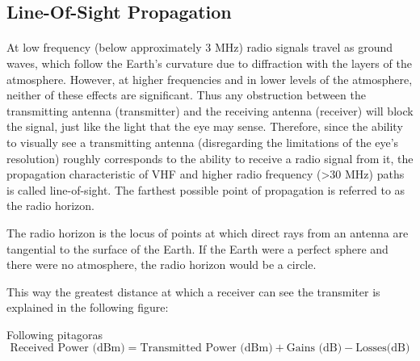 \subsection*{Line-Of-Sight Propagation}
\paragraph{}
At low frequency (below approximately 3 MHz) radio signals travel as ground waves, which follow the Earth's curvature due to diffraction with the layers of the atmosphere.
However, at higher frequencies and in lower levels of the atmosphere, neither of these effects are significant. Thus any obstruction between the transmitting antenna (transmitter) and the receiving antenna (receiver) will block the signal, just like the light that the eye may sense. Therefore, since the ability to visually see a transmitting antenna (disregarding the limitations of the eye's resolution) roughly corresponds to the ability to receive a radio signal from it, the propagation characteristic of VHF and higher radio frequency (>30 MHz) paths is called line-of-sight. The farthest possible point of propagation is referred to as the radio horizon.

The radio horizon is the locus of points at which direct rays from an antenna are tangential to the surface of the Earth. If the Earth were a perfect sphere and there were no atmosphere, the radio horizon would be a circle.

This way the greatest distance at which a receiver can see the transmiter is explained in the following figure:

Following pitagoras
\begin{equation*}\label{eq:link_budget} 
 		\text{Received Power (dBm)} = \text{Transmitted Power (dBm)} + \text{Gains (dB)} - \text{Losses(dB)}
\end{equation*}

% 	
